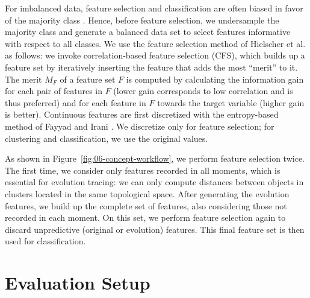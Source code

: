 \documentclass[
  oneside]{book}
\begin{document}
For imbalanced data, feature selection and classification are often biased in favor of the majority class \autocite{leevy2018survey}.
Hence, before feature selection, we undersample the majority class and generate a balanced data set to select features informative with respect to all classes.
We use the feature selection method of Hielscher et al. \autocite{HielscherEtAl:CBMS14} as follows:
we invoke correlation-based feature selection \autocite{Hall:CFS2000} (CFS), which builds up a feature set by iteratively inserting the feature that adds the most ``merit'' to it.
The merit \(M_F\) of a feature set \(F\) is computed by calculating the information gain for each pair of features in \(F\) (lower gain corresponds to low correlation and is thus preferred) and for each feature in \(F\) towards the target variable (higher gain is better).
Continuous features are first discretized with the entropy-based method of Fayyad and Irani \autocite{Fayyad:MDL93}.
We discretize only for feature selection; for clustering and classification, we use the original values.

As shown in Figure~\ref{fig:06-concept-workflow}, we perform feature selection twice.
The first time, we consider only features recorded in all moments, which is essential for evolution tracing: we can only compute distances between objects in clusters located in the same topological space.
After generating the evolution features, we build up the complete set of features, also considering those not recorded in each moment.
On this set, we perform feature selection again to discard unpredictive (original or evolution) features.
This final feature set is then used for classification.

\hypertarget{evo-evaluation}{%
\section{Evaluation Setup}\label{evo-evaluation}}
\end{document}
